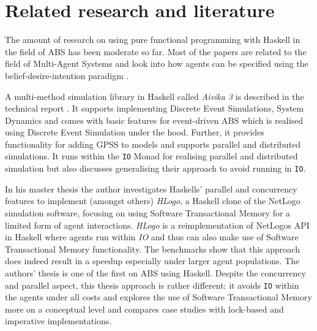 \section{Related research and literature}
\label{sec:literature}
The amount of research on using pure functional programming with Haskell in the field of ABS has been moderate so far. Most of the papers are related to the field of Multi-Agent Systems and look into how agents can be specified using the belief-desire-intention paradigm \cite{de_jong_suitability_2014,jankovic_functional_2007,sulzmann_specifying_2007}.

A multi-method simulation library in Haskell called \textit{Aivika 3} is described in the technical report \cite{sorokin_aivika_2015}. It supports implementing Discrete Event Simulations, System Dynamics and comes with basic features for event-driven ABS which is realised using Discrete Event Simulation under the hood. Further, it provides functionality for adding GPSS to models and supports parallel and distributed simulations. It runs within the \texttt{IO} Monad for realising parallel and distributed simulation but also discusses generalising their approach to avoid running in \texttt{IO}.

In his master thesis \cite{bezirgiannis_improving_2013} the author investigates Haskells' parallel and concurrency features to implement (amongst others) \textit{HLogo}, a Haskell clone of the NetLogo \cite{wilensky_introduction_2015} simulation software, focusing on using Software Transactional Memory for a limited form of agent interactions. \textit{HLogo} is a reimplementation of NetLogos API in Haskell where agents run within \textit{IO} and thus can also make use of Software Transactional Memory functionality. The benchmarks show that this approach does indeed result in a speedup especially under larger agent populations. The authors' thesis is one of the first on ABS using Haskell. Despite the concurrency and parallel aspect, this thesis approach is rather different: it avoids \texttt{IO} within the agents under all costs and explores the use of Software Transactional Memory more on a conceptual level and compares case studies with lock-based and imperative implementations.

